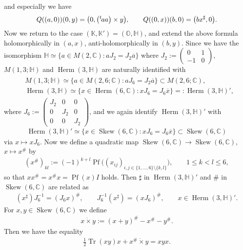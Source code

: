 \documentclass[pdftex]{sigma}
\numberwithin{equation}{section}
\newcommand{\BC}{\mathbb{C}}
\newcommand{\BH}{\mathbb{H}}
\newcommand{\BK}{\mathbb{K}}
\newcommand{\BO}{\mathbb{O}}
\newcommand{\Tr}{\operatorname{Tr}}
\newcommand{\Pf}{\operatorname{Pf}}
\newcommand{\dottimes}{\mathbin{\dot{\times}}}
\newcommand{\Skew}{\operatorname{Skew}}
\newcommand{\Herm}{\operatorname{Herm}}
\begin{document}
and especially we have
\begin{gather*} Q((a,0))(0,y)=\big(0,\big({}^t\hspace{-1pt}aa\big)\times y\big),\qquad Q((0,x))(b,0)=\big(bx^\sharp,0\big). \end{gather*}
Now we return to the case $(\BK,\BK')=(\BO,\BH)$, and extend the above formula holomorphically in $(a,x)$, anti-holomorphically in $(b,y)$.
Since we have the isomorphism $\BH\simeq\{a\in M(2,\BC)\colon aJ_2=J_2\overline{a}\}$
where $J_2:=\left(\begin{smallmatrix}0&1\\-1&0\end{smallmatrix}\right)$,
$M(1,3;\BH)$ and $\Herm(3,\BH)$ are naturally identified with
\begin{gather*}\begin{split}&
M(1,3;\BH) \simeq \{ a\in M(2,6;\BC)\colon aJ_6=J_2\overline{a}\}\subset M(2,6;\BC), \\
& \Herm(3,\BH) \simeq \{ x\in \Herm(6,\BC)\colon xJ_6=J_6\overline{x}\}=:\Herm(3,\BH)',\end{split}
\end{gather*}
where $J_6:=\left(\begin{smallmatrix}J_2&0&0\\0&J_2&0\\0&0&J_2\end{smallmatrix}\right)$,
and we again identify $\Herm(3,\BH)'$ with
\begin{gather*} \Herm(3,\BH)'\simeq \{ x\in \Skew(6,\BC)\colon xJ_6=J_6\overline{x}\}\subset\Skew(6,\BC) \end{gather*}
via $x\mapsto xJ_6$. Now we define a quadratic map $\Skew(6,\BC)\to\Skew(6,\BC)$, $x\mapsto x^\#$ by
\begin{gather}\label{adjoint6}
(x^\#)_{kl}:=(-1)^{k+l}\Pf\big((x_{ij})_{i,j\in\{1,\ldots,6\}\setminus\{k,l\}}\big), \qquad 1\le k<l\le 6 ,
\end{gather}
so that $xx^\#=x^\#x=\Pf(x)I$ holds. Then $\sharp$ in $\Herm(3,\BH)'$ and $\#$ in $\Skew(6,\BC)$ are related as
\begin{gather*} (x^\sharp)J_6^{-1}=(J_6x)^\#,\qquad J_6^{-1}(x^\sharp)=(xJ_6)^\#, \qquad x\in\Herm(3,\BH)'. \end{gather*}
For $x,y\in\Skew(6,\BC)$ we define
\begin{gather*} x\dottimes y:=(x+y)^\#-x^\#-y^\#. \end{gather*}
Then we have the equality
\begin{gather*} \tfrac{1}{2}\Tr(xy)x+x^\#\dottimes y=xyx. \end{gather*}
\end{document}

